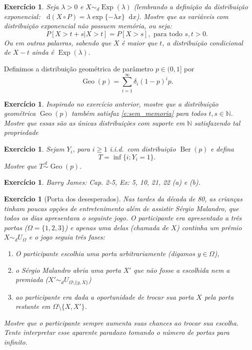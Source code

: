 \documentclass[reqno, final]{book}
\newcommand*\1{\mathds{1}}
\newtheorem{exercise}[example]{Exercício}
\DeclareMathOperator{\Ber}{Ber}
\DeclareMathOperator{\Geo}{Geo}
\DeclareMathOperator{\Exp}{Exp}
\def \iid{i.i.d.~}
\def \distr{\sim_d}
\renewcommand*\d{\mathop{}\!\mathrm{d}}
\begin{document}
\begin{exercise}
  Seja $\lambda > 0$ e $X \distr \Exp(\lambda)$ (lembrando a definição da distribuição exponencial: $\d (X \circ P) = \lambda \exp\{- \lambda x\} \d x$).
  Mostre que as variáveis com distribuição exponencial não possuem memória, ou seja:
  \begin{equation}
    \label{e:sem_memoria}
    P[X > t + s | X > t] = P [X > s], \text{ para todo $s, t > 0$}.
  \end{equation}
  Ou em outras palavras, sabendo que $X$ é maior que $t$, a distribuição condicional de $X - t$ ainda é $\Exp(\lambda)$.
\end{exercise}

Definimos a distribuição geométrica  de parâmetro $p \in (0,1]$ por
\begin{equation}
  \Geo(p) = \sum_{i = 1}^\infty \delta_i (1-p)^i p.
\end{equation}

\begin{exercise}
  Inspirado no exercício anterior, mostre que a distribuição geométrica $\Geo(p)$ também satisfaz \eqref{e:sem_memoria} para todos $t, s \in \mathbb{N}$.
  Mostre que essas são as únicas distribuições com suporte em $\mathbb{N}$ satisfazendo tal propriedade
\end{exercise}

\begin{exercise}
  \label{x:geo_time}
  Sejam $Y_i$, para $i \geq 1$ \iid com distribuição $\Ber(p)$ e defina
  \begin{equation}
    T = \inf\{i; Y_i = 1\}.
  \end{equation}
  Mostre que $T \overset{d}\sim \Geo(p)$.
\end{exercise}

\begin{exercise}
  Barry James: Cap. 2-5, Ex: 5, 10, 21, 22 (a) e (b).
\end{exercise}

\begin{exercise}[Porta dos desesperados]
  Nas tardes da década de 80, as crianças tinham poucas opções de entretenimento além de assistir Sérgio Malandro, que todos os dias apresentava o seguinte jogo.
  O participante era apresentado a três portas ($\Omega = \{1,2,3\}$) e apenas uma delas (chamada de $X$) continha um prêmio $X \distr U_{\Omega}$ e o jogo seguia três fases:
  \begin{enumerate}[\quad a)]
  \item O participante escolhia uma porta arbitrariamente (digamos $y \in \Omega$),
  \item o Sérgio Malandro abria uma porta $X'$ que não fosse a escolhida nem a premiada ($X' \distr U_{\Omega \setminus \{y, X\}}$)
  \item ao participante era dada a oportunidade de trocar sua porta $X$ pela porta restante em $\Omega \setminus \{X, X'\}$.
  \end{enumerate}
  Mostre que o participante sempre aumenta suas chances ao trocar sua escolha.
  Tente interpretar esse aparente paradoxo tomando o número de portas para infinito.
\end{exercise}
\end{document}
